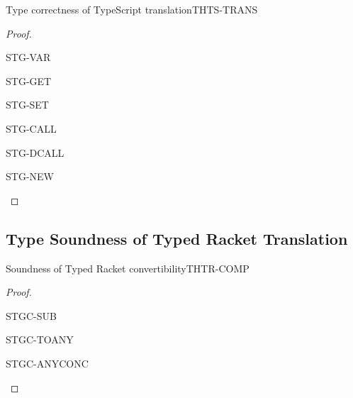 \documentclass[acmlarge, anonymous, authordraft]{acmart}
\begin{document}
\begin{lemma}{Type correctness of TypeScript translation}{THTS-TRANS}
  \begin{conds}
    \cond{$\TR\K = \Kp$}
    \cond{$\TR\Env = \Envp$}
  \end{conds}

  \then\axiom{$\EnvType\Envp\cdot\Kp{\TRG{\e}\Env}{\any}$}

  \begin{proof} 

    \begin{case}{STG-VAR}    
    \end{case}

    \begin{case}{STG-GET}
    \end{case}

    \begin{case}{STG-SET}
    \end{case}

    \begin{case}{STG-CALL}
    \end{case}

    \begin{case}{STG-DCALL}
    \end{case}

    \begin{case}{STG-NEW}
    \end{case}
  \end{proof}
\end{lemma}
\subsection{Type Soundness of Typed Racket Translation}
\begin{lemma}{Soundness of Typed Racket convertibility}{THTR-COMP}
  \begin{conds}
    \cond{$\EnvTypeS\Env\K\e\t$}
    \cond{$\ep = \TRG{\e}\Env$}
    \cond{$\TR\K = \Kp$}
    \cond{$\TR\Env = \Envp$}
    \cond{$\EnvType\Envp\cdot\Kp{\ep}{\t}$}
  \end{conds}
  \then\axiom{$\EnvType\Envp\cdot\Kp{\TAG\e\Env{\tp}}{\tp}$}

  \begin{proof}{ }

  \begin{case}{STGC-SUB}
  \end{case}

  \begin{case}{STGC-TOANY}
  \end{case}

  \begin{case}{STGC-ANYCONC}
  \end{case}

  \end{proof}
\end{lemma}
\end{document}
